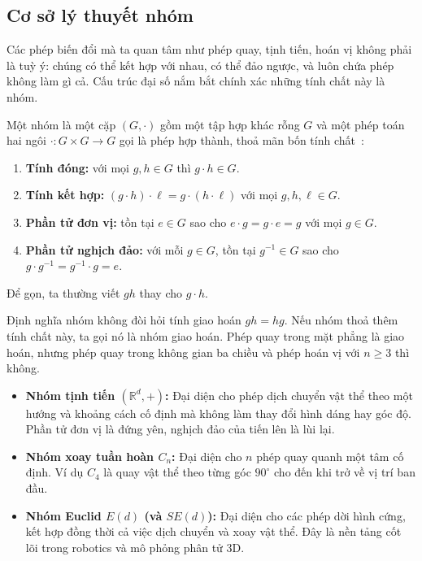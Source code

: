\subsection{Cơ sở lý thuyết nhóm}
\label{subsec:group-theory}
 
Các phép biến đổi mà ta quan tâm như phép quay, tịnh tiến, hoán vị không phải
là tuỳ ý: chúng có thể kết hợp với nhau, có thể đảo ngược, và luôn chứa phép không làm gì cả. Cấu trúc đại số nắm bắt chính xác những tính chất này là nhóm.
 
\begin{definition}[Nhóm]
\label{def:nhom}
Một nhóm là một cặp $(G,\cdot)$ gồm một tập hợp khác rỗng $G$ và một phép toán hai ngôi
$\cdot:G\times G\to G$ gọi là phép hợp thành, thoả mãn bốn tính chất~\cite{bronstein2021geometric}:
\begin{enumerate}[label=\textbf{(G\arabic*)}, leftmargin=2.6em, itemsep=2pt, topsep=2pt]
  \item \textbf{Tính đóng:} với mọi $g,h\in G$ thì $g\cdot h\in G$.
  \item \textbf{Tính kết hợp:}
        $(g\cdot h)\cdot \ell = g\cdot(h\cdot \ell)$ với mọi $g,h,\ell\in G$.
  \item \textbf{Phần tử đơn vị:} tồn tại $e\in G$ sao cho
        $e\cdot g = g\cdot e = g$ với mọi $g\in G$.
  \item \textbf{Phần tử nghịch đảo:} với mỗi $g\in G$, tồn tại
        $g^{-1}\in G$ sao cho $g\cdot g^{-1}=g^{-1}\cdot g = e$.
\end{enumerate}
Để gọn, ta thường viết $gh$ thay cho $g\cdot h$.
\end{definition}
 
\begin{remark}
Định nghĩa nhóm không đòi hỏi tính giao hoán $gh=hg$. Nếu nhóm thoả thêm
tính chất này, ta gọi nó là nhóm giao hoán. Phép quay trong mặt phẳng là giao hoán, nhưng phép quay trong không gian ba chiều và phép
hoán vị với $n\ge 3$ thì không.
\end{remark}
 
\begin{example}
\label{vd:cac-nhom}
\leavevmode
\begin{itemize}[leftmargin=1.4em, itemsep=2pt, topsep=2pt]
  \item \textbf{Nhóm tịnh tiến $(\mathbb{R}^{d},+)$:} Đại diện cho phép dịch chuyển vật thể theo một hướng và khoảng cách cố định mà không làm thay đổi hình dáng hay góc độ. Phần tử đơn vị là đứng yên, nghịch đảo của tiến lên là lùi lại.
  \item \textbf{Nhóm xoay tuần hoàn $C_{n}$:} Đại diện cho $n$ phép quay quanh một tâm cố định. Ví dụ $C_{4}$ là quay vật thể theo từng góc $90^{\circ}$ cho đến khi trở về vị trí ban đầu.
  \item \textbf{Nhóm Euclid $E(d)$ (và $SE(d)$):} Đại diện cho các phép dời hình cứng, kết hợp đồng thời cả việc dịch chuyển và xoay vật thể. Đây là nền tảng cốt lõi trong robotics và mô phỏng phân tử 3D.
\end{itemize}
\end{example}
 
